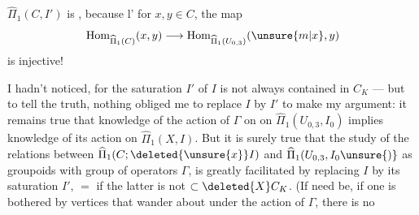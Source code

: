 $\widehat\Pi_1(C,I')$ is  , because l' for $x,y\in C$, the map
\[
\operatorname{Hom}_{\widehat\Pi_1(C)}(x,y)\longrightarrow\operatorname{Hom}_{\widehat\Pi_1(U_{0,3})}(\unsure{m|x},y)
\]
is injective!

I hadn't noticed, for the saturation $I'$ of $I$  is not always  contained in  $C_K$ --- but to tell the truth, nothing obliged me to replace $I$ by $I'$ to make my argument: it remains true that knowledge of the action of $\Gamma$ on on $\widehat\Pi_1(U_{0,3},I_0)$ implies knowledge of its action on $\widehat\Pi_1(X,I)$. But it is surely true that the study of the relations between $\widehat\Pi_1(C;\deleted{\unsure{x}}I)$ and $\widehat\Pi_1(U_{0,3},I_0\unsure{)}$ as groupoids with group of operators $\Gamma$, is greatly facilitated by replacing $I$ by its saturation $I'$, $=$ if the latter is not $\subset\deleted{X}C_K$. (If need be, if one is bothered by vertices that wander about under the action of $\Gamma$, there is no

